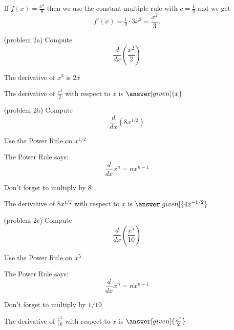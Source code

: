 \documentclass{ximera}
\begin{document}
\begin{example}[example 2]
 If $f(x) = \frac{x^3}{9}$ then  we use the constant multiple rule with $c = \frac19$ and we get 
\[
f'(x) = \tfrac19 \cdot 3x^2 
= \frac{x^2}{3}.
\]
\end{example}

\begin{problem}(problem 2a)
  Compute 
  \[
  \frac{d}{dx} \left(\frac{x^2}{2}\right)
  \]
  
    \begin{hint}
      The derivative of $x^2$ is $2x$
    \end{hint}    
		The derivative of $\frac{x^2}{2}$ with respect to $x$ is
		 $\answer[given]{x}$
	
\end{problem}

\begin{problem}(problem 2b)
  Compute 
  \[
  \frac{d}{dx} \left(8x^{1/2}\right)
  \]
  
    \begin{hint}
      Use the Power Rule on $x^{1/2}$
    \end{hint}
    \begin{hint}
      The Power Rule says:
      \[
      \frac{d}{dx} x^n = nx^{n-1}
      \]
    \end{hint}
		\begin{hint}
		  Don't forget to multiply by $8$
		\end{hint}
		The derivative of $8x^{1/2}$ with respect to $x$ is
		 $\answer[given]{4x^{-1/2}}$
	
\end{problem}

\begin{problem}(problem 2c)
  Compute 
  \[
  \frac{d}{dx} \left(\frac{x^5}{10}\right)
  \]
  
    \begin{hint}
      Use the Power Rule on $x^5$
    \end{hint}
    \begin{hint}
      The Power Rule says:
      \[
      \frac{d}{dx} x^n = nx^{n-1}
      \]
    \end{hint}
		\begin{hint}
		  Don't forget to multiply by $1/10$
		\end{hint}
		
		The derivative of $\frac{x^5}{10}$ with respect to $x$ is
		 $\answer[given]{\frac{x^4}{2}}$
	
\end{problem}
\end{document}
